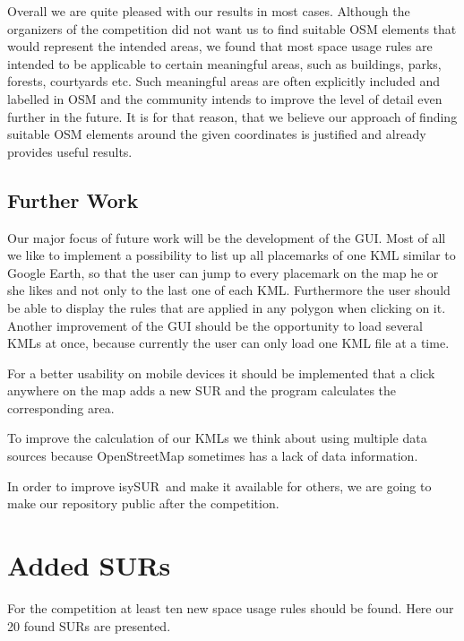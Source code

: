 \documentclass[11pt,fleqn]{book} %
\newcommand{\ProjectTitle}{isySUR}
\newcommand{\pt}{\ProjectTitle}
\begin{document}
Overall we are quite pleased with our results in most cases. Although the organizers of the competition did not want us to find suitable OSM elements that would represent the intended areas, we found that most space usage rules are intended to be applicable to certain meaningful areas, such as buildings, parks, forests, courtyards etc. Such meaningful areas are often explicitly included and labelled in OSM and the community intends to improve the level of detail even further in the future. It is for that reason, that we believe our approach of finding suitable OSM elements around the given coordinates is justified and already provides useful results. 

\section{Further Work}
Our major focus of future work will be the development of the GUI. Most of all we like to implement a possibility to list up all placemarks of one KML similar to Google Earth, so that the user can jump to every placemark on the map he or she likes and not only to the last one of each KML. Furthermore the user should be able to display the rules that are applied in any polygon when clicking on it.
Another improvement of the GUI should be the opportunity to load several KMLs at once, because currently the user can only load one KML file at a time.

For a better usability on mobile devices it should be implemented that a click anywhere on the map adds a new SUR and the program calculates the corresponding area. 

To improve the calculation of our KMLs we think about using multiple data sources because OpenStreetMap sometimes has a lack of data information.

In order to improve \pt\ and make it available for others, we are going to make our repository public after the competition.


\chapter{Added SURs}\label{sec:surs}
For the competition at least ten new space usage rules should be found. Here our 20 found SURs are presented.
\end{document}
